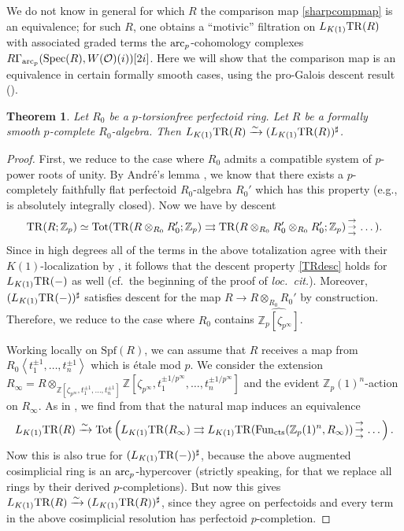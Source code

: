\documentclass{amsart}
\newcommand{\triplearrows}{\begin{smallmatrix} \to \\ \to \\ 
\to \end{smallmatrix} }
\newtheorem{theorem}{Theorem}[section]
\theoremstyle{definition}
\newcommand{\spec}{\mathrm{Spec}}
\begin{document}
We do not know in general for which $R$ the comparison map \eqref{sharpcompmap} is an
equivalence; for such $R$, one obtains a ``motivic'' filtration on $L_{K(1)}
\mathrm{TR}(R)$ with associated graded terms the $\mathrm{arc}_{{p}}$-cohomology 
complexes 
$R \Gamma_{\arc}(
\spec(R), W(\mathcal{O})(i))[2i]$.
Here we will show that the comparison map is an equivalence in certain formally
smooth cases, using the pro-Galois descent result (). 
\begin{theorem} 
Let $R_0$ be a $p$-torsionfree perfectoid ring. 
Let $R$ be a formally smooth $p$-complete $R_0$-algebra. 
Then $L_{K(1)} \mathrm{TR}(R) \xrightarrow{\sim} (L_{K(1)} \mathrm{TR}(R))^{\sharp}$. 
\label{sharpcompACcase}
\end{theorem} 
\begin{proof} 
First, we reduce to the case where $R_0$ admits a compatible system of $p$-power
roots of unity. By Andr\'e's lemma \cite[Th.~7.12]{Prisms}, we know that 
there exists a $p$-completely faithfully flat perfectoid $R_0$-algebra $R_0'$ which has
this property (e.g., is absolutely integrally closed). 
Now we have by descent
\begin{equation} \label{TRdesc}  \TR(R; \mathbb{Z}_p) \simeq \mathrm{Tot}( \TR(R \otimes_{R_0} R_0' ;
\mathbb{Z}_p) \rightrightarrows \TR( R \otimes_{R_0}R_0' \otimes_{R_0} R_0';
\mathbb{Z}_p) \triplearrows \dots ).  \end{equation}
Since in high degrees all of the terms in the above totalization agree with their
$K(1)$-localization by , it follows that  
the 
descent property \eqref{TRdesc}
holds for $L_{K(1) } \mathrm{TR}(-)$ as well 
(cf.~the beginning of the proof of \emph{loc.~cit.}). 
Moreover, $(L_{K(1)} \mathrm{TR}(-))^{\sharp}$ satisfies descent for the map $R \to R
\otimes_{R_0} R_0'$ by construction.
Therefore, we reduce to the case where $R_0$ contains
$\widehat{\mathbb{Z}_p[\zeta_{p^\infty}]}$.

Working locally on $\mathrm{Spf}(R)$, we can assume that $R$ 
receives a map from 
$R_0\left \langle t_1^{\pm 1}, \dots, t_n^{\pm 1}\right\rangle$ 
which is \'etale mod $p$. 
We consider the 
extension $R_\infty = R \otimes_{\mathbb{Z}[\zeta_{p^\infty}, t_1^{\pm 1},
\dots, t_n^{\pm 1}]} 
\mathbb{Z}[\zeta_{p^\infty}, t_1^{\pm 1/p^\infty},
\dots, t_n^{\pm 1/p^\infty}]$ and the evident $\mathbb{Z}_p(1)^n$-action on $R_\infty$. 
As in , we find from 
 that the natural map induces an equivalence
\[ L_{K(1)} \TR(R) \xrightarrow{\sim} 
\mathrm{Tot}\left( L_{K(1)} \TR(R_\infty) \rightrightarrows L_{K(1)} \TR(
\mathrm{Fun}_{\mathrm{cts}}( \mathbb{Z}_p(1)^n, R_\infty)) \triplearrows \dots
\right).
\]
Now this is also true for $(L_{K(1)}\mathrm{TR}(-))^{\sharp}$, because the above
augmented cosimplicial ring is an $\mathrm{arc}_{{p}}$-hypercover (strictly speaking, for that we replace
all rings by their derived $p$-completions). 
But now this gives $L_{K(1)} \mathrm{TR}(R) \xrightarrow{\sim} 
(L_{K(1)}\mathrm{TR}(R))^{\sharp}$, since they agree on perfectoids and every term in
the above cosimplicial resolution has perfectoid $p$-completion. 
\end{proof} 
\end{document}
